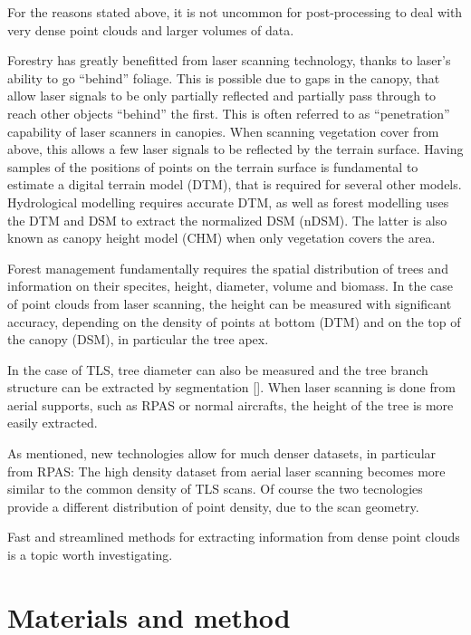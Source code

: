 \documentclass[]{elsarticle} %
\begin{document}
For the reasons stated above, it is not uncommon for post-processing to
deal with very dense point clouds and larger volumes of data.

Forestry has greatly benefitted from laser scanning technology, thanks
to laser's ability to go ``behind'' foliage. This is possible due to
gaps in the canopy, that allow laser signals to be only partially
reflected and partially pass through to reach other objects ``behind''
the first. This is often referred to as ``penetration'' capability of
laser scanners in canopies. When scanning vegetation cover from above,
this allows a few laser signals to be reflected by the terrain surface.
Having samples of the positions of points on the terrain surface is
fundamental to estimate a digital terrain model (DTM), that is required
for several other models. Hydrological modelling requires accurate DTM,
as well as forest modelling uses the DTM and DSM to extract the
normalized DSM (nDSM). The latter is also known as canopy height model
(CHM) when only vegetation covers the area.

Forest management fundamentally requires the spatial distribution of
trees and information on their specites, height, diameter, volume and
biomass. In the case of point clouds from laser scanning, the height can
be measured with significant accuracy, depending on the density of
points at bottom (DTM) and on the top of the canopy (DSM), in particular
the tree apex.

In the case of TLS, tree diameter can also be measured and the tree
branch structure can be extracted by segmentation {[}{]}. When laser
scanning is done from aerial supports, such as RPAS or normal aircrafts,
the height of the tree is more easily extracted.

As mentioned, new technologies allow for much denser datasets, in
particular from RPAS: The high density dataset from aerial laser
scanning becomes more similar to the common density of TLS scans. Of
course the two tecnologies provide a different distribution of point
density, due to the scan geometry.

Fast and streamlined methods for extracting information from dense point
clouds is a topic worth investigating.

\hypertarget{materials-and-method}{%
\section{Materials and method}\label{materials-and-method}}
\end{document}
